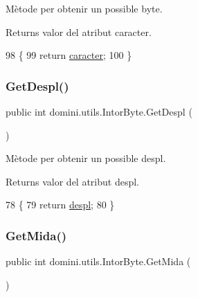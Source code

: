 Mètode per obtenir un possible byte. 

\begin{DoxyReturn}{Returns}
valor del atribut caracter. 
\end{DoxyReturn}

\begin{DoxyCode}
98    \{
99       \textcolor{keywordflow}{return} \hyperlink{classdomini_1_1utils_1_1IntorByte_adbb2e8c31ead2f27d85ff39683b9a8a7}{caracter};
100    \}
\end{DoxyCode}
\mbox{\label{classdomini_1_1utils_1_1IntorByte_a5d99bc2397d586c3e3319eadf7f23e4d}} 
\subsubsection{\texorpdfstring{Get\+Despl()}{GetDespl()}}
{\footnotesize\ttfamily public int domini.\+utils.\+Intor\+Byte.\+Get\+Despl (\begin{DoxyParamCaption}{ }\end{DoxyParamCaption})\hspace{0.3cm}{\ttfamily [inline]}}



Mètode per obtenir un possible despl. 

\begin{DoxyReturn}{Returns}
valor del atribut despl. 
\end{DoxyReturn}

\begin{DoxyCode}
78    \{
79       \textcolor{keywordflow}{return} \hyperlink{classdomini_1_1utils_1_1IntorByte_a83872b8acc9ab187acbc2175d5bf320e}{despl};
80    \}
\end{DoxyCode}
\mbox{\label{classdomini_1_1utils_1_1IntorByte_abccf2f9cda2f62acdf0c1342f9acdead}} 
\subsubsection{\texorpdfstring{Get\+Mida()}{GetMida()}}
{\footnotesize\ttfamily public int domini.\+utils.\+Intor\+Byte.\+Get\+Mida (\begin{DoxyParamCaption}{ }\end{DoxyParamCaption})\hspace{0.3cm}{\ttfamily [inline]}}



